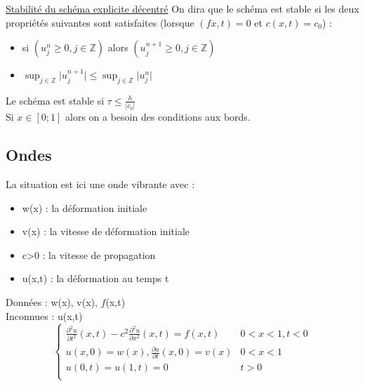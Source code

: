 \documentclass[../main.tex]{subfiles}
\begin{document}
\quad \underline{Stabilité du schéma explicite décentré}
On dira que le schéma est stable si les deux propriétés suivantes sont satisfaites (lorsque $(fx,t)=0$ et $c(x,t)=c_0$) : \begin{itemize}
    \item si $( u_j^n \geq 0, j\in \mathbb{Z})$ alors $(u_j^{n+1} \geq 0, j \in \mathbb{Z})$\\
    \item $\sup_{j \in \mathbb{Z}} \lvert u_j^{n+1} \rvert \leq \sup_{j \in \mathbb{Z}} \lvert u_j^n\rvert$\\
\end{itemize}

Le schéma est stable si $\tau \leq \frac{h}{\lvert c_0 \rvert}$\\

Si $x\in [0;1]$ alors on a besoin des conditions aux bords.\\

\subsection{Ondes}
La situation est ici une onde vibrante avec : \begin{itemize}
    \item w(x) : la déformation initiale\\
    \item v(x) : la vitesse de déformation initiale\\
    \item c>0 : la vitesse de propagation\\
    \item u(x,t) : la déformation au temps t\\
\end{itemize}
Données : w(x), v(x), $f$(x,t)\\
Inconnues : u(x,t)\\

\begin{equation}
    \begin{cases}
        \frac{\partial^2 u}{\partial t^2}(x,t) - c^2 \frac{\partial^2 u}{\partial x^2}(x,t) = f(x,t) & 0<x<1, t<0\\
        u(x,0) = w(x), \frac{\partial u}{\partial t}(x,0) = v(x) & 0<x<1\\
        u(0,t) = u(1,t) = 0 & t>0\\
    \end{cases}
\end{equation}
\end{document}
